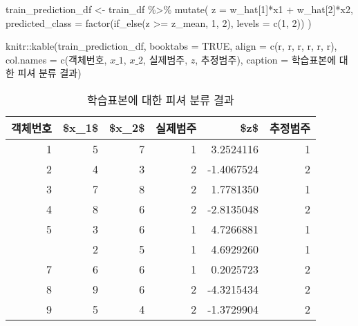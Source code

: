 \documentclass[
]{book}
\newenvironment{Shaded}{\begin{snugshade}}{\end{snugshade}}
\newcommand{\AttributeTok}[1]{\textcolor[rgb]{0.77,0.63,0.00}{#1}}
\newcommand{\ConstantTok}[1]{\textcolor[rgb]{0.00,0.00,0.00}{#1}}
\newcommand{\DecValTok}[1]{\textcolor[rgb]{0.00,0.00,0.81}{#1}}
\newcommand{\FunctionTok}[1]{\textcolor[rgb]{0.00,0.00,0.00}{#1}}
\newcommand{\NormalTok}[1]{#1}
\newcommand{\OtherTok}[1]{\textcolor[rgb]{0.56,0.35,0.01}{#1}}
\newcommand{\SpecialCharTok}[1]{\textcolor[rgb]{0.00,0.00,0.00}{#1}}
\newcommand{\StringTok}[1]{\textcolor[rgb]{0.31,0.60,0.02}{#1}}
\begin{document}
\begin{Shaded}
\begin{Highlighting}[]
\NormalTok{train\_prediction\_df }\OtherTok{\textless{}{-}}\NormalTok{ train\_df }\SpecialCharTok{\%\textgreater{}\%}
  \FunctionTok{mutate}\NormalTok{(}
    \AttributeTok{z =}\NormalTok{ w\_hat[}\DecValTok{1}\NormalTok{]}\SpecialCharTok{*}\NormalTok{x1 }\SpecialCharTok{+}\NormalTok{ w\_hat[}\DecValTok{2}\NormalTok{]}\SpecialCharTok{*}\NormalTok{x2,}
    \AttributeTok{predicted\_class =} \FunctionTok{factor}\NormalTok{(}\FunctionTok{if\_else}\NormalTok{(z }\SpecialCharTok{\textgreater{}=}\NormalTok{ z\_mean, }\DecValTok{1}\NormalTok{, }\DecValTok{2}\NormalTok{), }\AttributeTok{levels =} \FunctionTok{c}\NormalTok{(}\DecValTok{1}\NormalTok{, }\DecValTok{2}\NormalTok{))}
\NormalTok{    )}

\NormalTok{knitr}\SpecialCharTok{::}\FunctionTok{kable}\NormalTok{(train\_prediction\_df, }\AttributeTok{booktabs =} \ConstantTok{TRUE}\NormalTok{,}
             \AttributeTok{align =} \FunctionTok{c}\NormalTok{(}\StringTok{\textquotesingle{}r\textquotesingle{}}\NormalTok{, }\StringTok{\textquotesingle{}r\textquotesingle{}}\NormalTok{, }\StringTok{\textquotesingle{}r\textquotesingle{}}\NormalTok{, }\StringTok{\textquotesingle{}r\textquotesingle{}}\NormalTok{, }\StringTok{\textquotesingle{}r\textquotesingle{}}\NormalTok{, }\StringTok{\textquotesingle{}r\textquotesingle{}}\NormalTok{),}
             \AttributeTok{col.names =} \FunctionTok{c}\NormalTok{(}\StringTok{\textquotesingle{}객체번호\textquotesingle{}}\NormalTok{, }\StringTok{\textquotesingle{}$x\_1$\textquotesingle{}}\NormalTok{, }\StringTok{\textquotesingle{}$x\_2$\textquotesingle{}}\NormalTok{, }\StringTok{\textquotesingle{}실제범주\textquotesingle{}}\NormalTok{, }\StringTok{\textquotesingle{}$z$\textquotesingle{}}\NormalTok{, }\StringTok{\textquotesingle{}추정범주\textquotesingle{}}\NormalTok{),}
             \AttributeTok{caption =} \StringTok{\textquotesingle{}학습표본에 대한 피셔 분류 결과\textquotesingle{}}\NormalTok{)}
\end{Highlighting}
\end{Shaded}

\begin{table}

\caption{\label{tab:fisher-da-result}학습표본에 대한 피셔 분류 결과}
\centering
\begin{tabular}[t]{rrrrrr}
\toprule
객체번호 & \$x\_1\$ & \$x\_2\$ & 실제범주 & \$z\$ & 추정범주\\
\midrule
1 & 5 & 7 & 1 & 3.2524116 & 1\\
2 & 4 & 3 & 2 & -1.4067524 & 2\\
3 & 7 & 8 & 2 & 1.7781350 & 1\\
4 & 8 & 6 & 2 & -2.8135048 & 2\\
5 & 3 & 6 & 1 & 4.7266881 & 1\\
\addlinespace
6 & 2 & 5 & 1 & 4.6929260 & 1\\
7 & 6 & 6 & 1 & 0.2025723 & 2\\
8 & 9 & 6 & 2 & -4.3215434 & 2\\
9 & 5 & 4 & 2 & -1.3729904 & 2\\
\bottomrule
\end{tabular}
\end{table}
\end{document}
